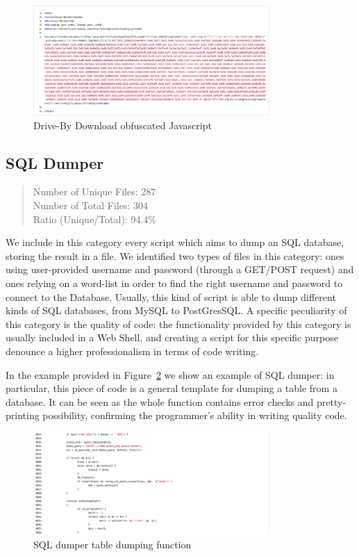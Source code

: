\begin{figure}[H]
\centerline{\includegraphics[width=0.8\textwidth]{Images/driveByDownload.jpg}}
\caption{Drive-By Download obfuscated Javascript\label{fig:driveByDownload}}
\end{figure}

\subsection{SQL Dumper}

\begin{quote}
Number of Unique Files: 287\\
Number of Total Files: 304\\
Ratio (Unique/Total): 94.4\%
\end{quote}

We include in this category every script which aims to dump an SQL database, storing the result in a file. We identified two types of files in this category: ones using user-provided username and password (through a GET/POST request) and ones relying on a word-list in order to find the right username and password to connect to the Database. Usually, this kind of script is able to dump different kinds of SQL databases, from MySQL to PostGresSQL. A specific peculiarity of this category is the quality of code: the functionality provided by this category is usually included in a Web Shell, and creating a script for this specific purpose denounce a higher professionalism in terms of code writing.

In the example provided in Figure~\ref{fig:SQLDumper} we show an example of SQL dumper: in particular, this piece of code is a general template for dumping a table from a database. It can be seen as the whole function contains error checks and pretty-printing possibility, confirming the programmer's ability in writing quality code.

\begin{figure}[H]
\centerline{\includegraphics[width=0.8\textwidth]{Images/SQLDumper.jpg}}
\caption{SQL dumper table dumping function\label{fig:SQLDumper}}
\end{figure}

